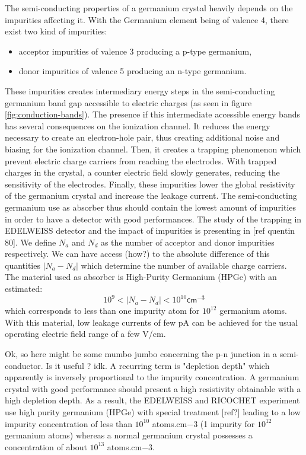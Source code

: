 The semi-conducting properties of a germanium crystal heavily depends on the impurities affecting it. With the Germanium element being of valence 4, there exist two kind of impurities:
\begin{itemize}
	\item acceptor impurities of valence 3 producing a p-type germanium,
	\item donor impurities of valence 5 producing an n-type germanium.
\end{itemize}
These impurities creates intermediary energy steps in the semi-conducting germanium band gap accessible to electric charges (as seen in figure \ref{fig:conduction-bands}). The presence if this intermediate accessible energy bands has several consequences on the ionization channel. It reduces the energy necessary to create an electron-hole pair, thus creating additional noise and biasing for the ionization channel. Then, it creates a trapping phenomenon which prevent electric charge carriers from reaching the electrodes. With trapped charges in the crystal, a counter electric field slowly generates, reducing the sensitivity of the electrodes. Finally, these impurities lower the global resistivity of the germanium crystal and increase the leakage current.
The semi-conducting germanium use as absorber thus should contain the lowest amount of impurities in order to have a detector with good performances.
The study of the trapping in EDELWEISS detector and the impact of impurities is presenting in [ref quentin 80].
We define $N_a$ and $N_d$ as the number of acceptor and donor impurities respectively. We  can have access (how?) to the absolute difference of this quantities $|N_a - N_d|$ which determine the number of available charge carriers.
The material used as absorber is High-Purity Germanium (HPGe) with an estimated:
$$ 10^{9} < |N_a - N_d| < 10^{10} \textsf{cm}^{-3}$$
which corresponds to less than one impurity atom for $10^{12}$ germanium atoms. With this material, low leakage currents of few pA can be achieved for the usual operating  electric field range of a few V/cm.

Ok, so here might be some mumbo jumbo concerning the p-n junction in a semi-conductor. Is it useful ? idk.
A recurring term is "depletion depth" which apparently is inversely proportional to the impurity concentration.
A germanium crystal with good performance should present a high resistivity obtainable with a high depletion depth.
As a result, the EDELWEISS and RICOCHET experiment use high purity germanium (HPGe) with special treatment [ref?] leading to a low impurity concentration of less than $10^{10}$ atoms.cm${-3}$ (1 impurity for $10^{12}$ germanium atoms) whereas a normal germanium crystal possesses a concentration of about $10^{13}$ atoms.cm${-3}$.

